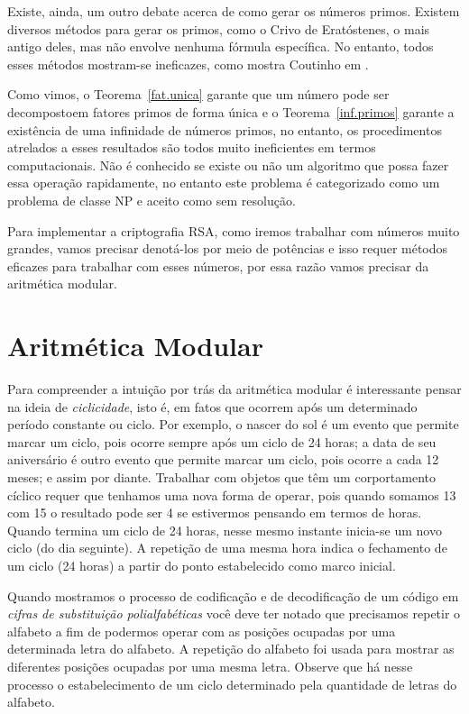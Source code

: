 Existe, ainda, um outro debate acerca de como gerar os n\'umeros primos. Existem diversos m\'etodos para gerar os primos, como o Crivo 
de Erat\'ostenes, o mais antigo deles, mas n\~ao envolve nenhuma f\'ormula espec\'ifica. No entanto, todos esses 
m\'etodos mostram-se ineficazes, como mostra Coutinho em \cite{cou:2014}.

Como vimos, o Teorema~\ref{fat.unica} garante que um n\'umero pode ser decompostoem fatores primos de forma \'unica e o Teorema~\ref{inf.primos} garante a exist\^{e}ncia de uma infinidade de n\'umeros primos, no entanto, os procedimentos atrelados a esses resultados s\~ao todos muito ineficientes em termos computacionais. N\~ao \'e conhecido se existe ou n\~ao um algoritmo que possa fazer essa opera\c{c}\~ao rapidamente, no entanto este problema \'e categorizado como um problema de classe NP e aceito como sem resolu\c{c}\~ao.

Para implementar a criptografia RSA, como iremos trabalhar com n\'{u}meros muito grandes, vamos precisar denot\'{a}-los por meio de pot\^{e}ncias e isso requer m\'{e}todos 
eficazes para trabalhar com esses n\'{u}meros, por essa raz\~ao vamos precisar da aritm\'{e}tica modular.  


\section{Aritm\'{e}tica Modular}

Para compreender a intui\c{c}\~{a}o por tr\'{a}s da aritm\'{e}tica modular \'{e} interessante pensar na ideia de \textit{ciclicidade}, 
isto \'{e}, em
fatos que ocorrem ap\'{o}s um determinado per\'{i}odo constante ou ciclo. Por exemplo, o nascer do sol \'{e} um evento que 
permite marcar um ciclo, pois ocorre sempre ap\'{o}s um ciclo de 24 horas; a data de seu anivers\'{a}rio \'{e} outro evento que permite marcar um ciclo, pois ocorre a cada 12 meses; e assim por diante. Trabalhar com objetos que t\^{e}m um corportamento c\'{i}clico requer que tenhamos uma nova forma de operar, pois quando somamos 13 com 15 o resultado pode ser 4 se estivermos pensando em termos de horas. Quando termina um ciclo de 24 horas, nesse mesmo instante inicia-se um novo ciclo (do dia seguinte). A repeti\c{c}\~{a}o de uma mesma hora indica o fechamento de um ciclo (24 horas) a partir do ponto estabelecido como marco inicial. 

Quando mostramos o processo de codifica\c{c}\~{a}o e de decodifica\c{c}\~{a}o de um c\'{o}digo em 
\textit{cifras de substitui\c{c}\~{a}o polialfab\'{e}ticas} voc\^{e} deve ter notado que precisamos repetir o alfabeto 
a fim de podermos operar com as posi\c{c}\~{o}es ocupadas por uma determinada letra do alfabeto. A repeti\c{c}\~{a}o do alfabeto 
foi usada para mostrar as diferentes posi\c{c}\~{o}es ocupadas por uma mesma letra. Observe que h\'{a} nesse processo o 
estabelecimento de um ciclo determinado pela quantidade de letras do alfabeto.

